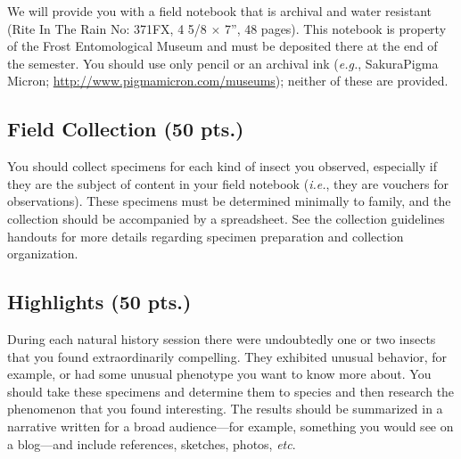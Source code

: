 \documentclass[letterpaper, 11pt]{article}
\begin{document}
\noindent{}We will provide you with a field notebook that is archival and water resistant (Rite In The Rain No: 371FX, 4 5/8 $\times$ 7'', 48 pages). This notebook is property of the Frost Entomological Museum and must be deposited there at the end of the semester. You should use only pencil or an archival ink (\textit{e.g.}, Sakura\textregistered{ }Pigma Micron\textregistered; \url{http://www.pigmamicron.com/museums}); neither of these are provided. 

\subsection*{Field Collection (50 pts.)}
You should collect specimens for each kind of insect you observed, especially if they are the subject of content in your field notebook (\textit{i.e.}, they are vouchers for observations). These specimens must be determined minimally to family, and the collection should be accompanied by a spreadsheet. See the collection guidelines handouts for more details regarding specimen preparation and collection organization.

\subsection*{Highlights (50 pts.)}
During each natural history session there were undoubtedly one or two insects that you found extraordinarily compelling. They exhibited unusual behavior, for example, or had some unusual phenotype you want to know more about. You should take these specimens and determine them to species and then research the phenomenon that you found interesting. The results should be summarized in a narrative written for a broad audience---for example, something you would see on a blog---and include references, sketches, photos, \textit{etc}.



\end{document}
